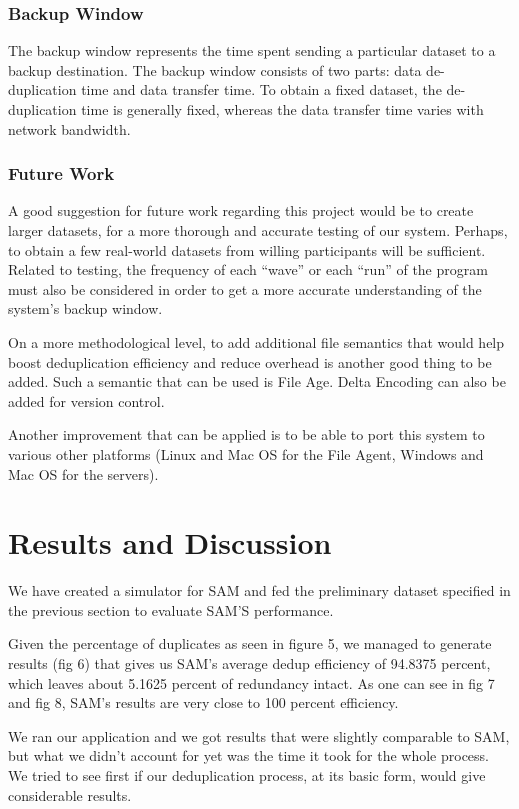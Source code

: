 \documentclass[journal]{IEEEtran}
\begin{document}
\subsubsection{Backup Window}
The backup window represents the time spent sending a particular dataset to a backup destination. The backup window consists of two parts: data de-duplication time and data transfer time. To obtain a fixed dataset, the de-duplication time is generally fixed, whereas the data transfer time varies with network bandwidth.

\subsubsection{Future Work}
A good suggestion for future work regarding this project would be to create larger datasets, for a more thorough and accurate testing of our system. Perhaps, to obtain a few real-world datasets from willing participants will be sufficient. Related to testing, the frequency of each “wave” or each “run” of the program must also be considered in order to get a more accurate understanding of the system’s backup window. 

On a more methodological level, to add additional file semantics that would help boost deduplication efficiency and reduce overhead is another good thing to be added. Such a semantic that can be used is File Age. Delta Encoding can also be added for version control. 

Another improvement that can be applied is to be able to port this system to various other platforms (Linux and Mac OS for the File Agent, Windows and Mac OS for the servers).


\section{Results and Discussion}

We have created a simulator for SAM and fed the preliminary dataset specified in the previous section to evaluate SAM'S performance.

Given the percentage of duplicates as seen in figure 5, we managed to generate results (fig 6)  that gives us SAM's average dedup efficiency of 94.8375 percent, which leaves about 5.1625 percent of redundancy intact. As one can see in fig 7 and fig 8, SAM's results are very close to 100 percent efficiency.

We ran our application and we got results that were slightly comparable to SAM, but what we didn’t account for yet was the time it took for the whole process. We tried to see first if our deduplication process, at its basic form, would give considerable results.
\end{document}
